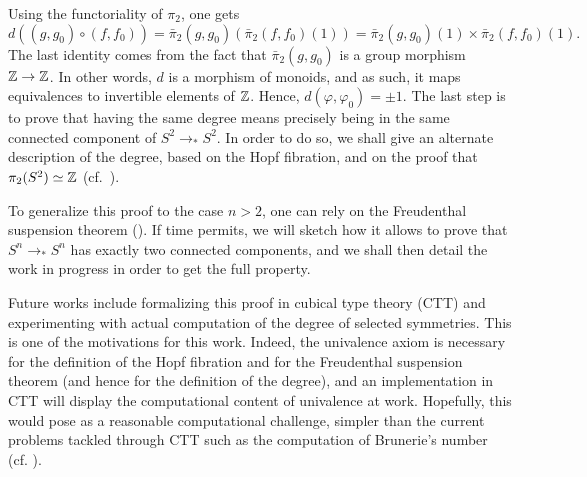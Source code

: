 \documentclass{easychair}
\newcommand{\Sp}{{S^2}}%
\newcommand{\Sn}{{S^n}}%
\newcommand{\ptdto}{\to_\ast}%
\begin{document}
Using the functoriality of $\pi_2$, one gets
\begin{displaymath}
  d((g,g_0)\circ (f,f_0)) = \bar\pi_2(g,g_0)\left( \bar\pi_2(f,f_0)(1)\right)
  = \bar\pi_2(g,g_0)(1)\times\bar\pi_2(f,f_0)(1).
\end{displaymath}
The last identity comes from the fact that $\bar\pi_2(g,g_0)$ is a
group morphism $\mathbb{Z}\to\mathbb{Z}$. In other words, $d$ is a morphism of
monoids, and as such, it maps equivalences to invertible elements of
$\mathbb{Z}$. Hence, $d(\varphi,\varphi_0) = \pm 1$. The last step is to
prove that having the same degree means precisely being in the same
connected component of $\Sp \ptdto \Sp$. In order to do so, we shall
give an alternate description of the degree, based on the Hopf
fibration, and on the proof that $\pi_2(\Sp) \weq \ZZ$ (cf.\
\cite[Ch.~8.6]{HoTT}).

To generalize this proof to the case $n>2$, one can rely on the
Freudenthal suspension theorem (\cite[Ch.~8.6]{HoTT}). If time
permits, we will sketch how it allows to prove that $\Sn \ptdto \Sn$
has exactly two connected components, and we shall then detail the
work in progress in order to get the full property.

Future works include formalizing this proof in cubical type theory
(CTT) and experimenting with actual computation of the degree of
selected symmetries. This is one of the motivations for this
work. Indeed, the univalence axiom is necessary for the definition of
the Hopf fibration and for the Freudenthal suspension theorem (and
hence for the definition of the degree), and an implementation in CTT
will display the computational content of univalence at
work. Hopefully, this would pose as a reasonable computational
challenge, simpler than the current problems tackled through CTT such
as the computation of Brunerie's number (cf. \cite{brunerie:thesis}).



\end{document}
